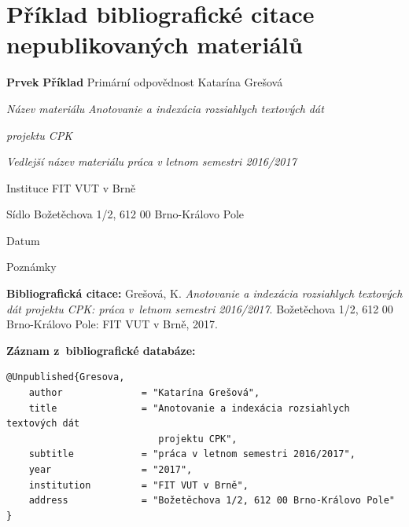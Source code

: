 
\newpage
\section*{Příklad bibliografické citace nepublikovaných materiálů}
\label{pr-nepublikovane}
\begin{tabbing}
\zarazky
\textbf{Prvek} \> \textbf{Příklad} \odradkovani
Primární odpovědnost \>
Katarína {\sc Grešová}

\odradkovani
{\em Název materiálu} \>
{\em Anotovanie a indexácia rozsiahlych textových dát}

    \odradkovani \>
    {\em projektu CPK}

\odradkovani
{\em Vedlejší název materiálu}\footnotemark[1] \>
{\em práca v letnom semestri 2016/2017}

\odradkovani
Instituce \>
FIT VUT v Brně

\odradkovani
Sídlo \>
Božetěchova 1/2, 612 00 Brno-Královo Pole

\odradkovani
Datum 

\odradkovani
Poznámky\footnotemark[2] \>

\odradkovani
\end{tabbing}

\noindent \textbf{Bibliografická citace:} \odradkovani
{\sc Grešová}, K. {\em Anotovanie a indexácia rozsiahlych textových dát projektu CPK: práca v~letnom semestri 2016/2017}. Božetěchova 1/2, 612 00 Brno-Královo Pole: FIT VUT
v Brně, 2017.

\bigskip \bigskip
\noindent \textbf{Záznam z~bibliografické databáze:}
\vspace{-0.5em}
\begin{verbatim}
@Unpublished{Gresova,
    author              = "Katarína Grešová",
    title               = "Anotovanie a indexácia rozsiahlych textových dát 
                           projektu CPK",
    subtitle            = "práca v letnom semestri 2016/2017",
    year                = "2017",
    institution         = "FIT VUT v Brně",
    address             = "Božetěchova 1/2, 612 00 Brno-Královo Pole"
}
\end{verbatim}


